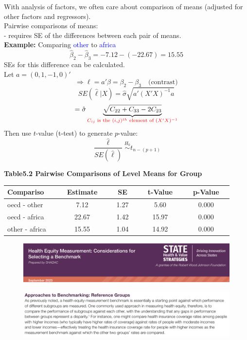 \documentclass[14pt]{extarticle}
\begin{document}
With analysis of factors, we often care about comparison of means (adjusted for other factors and regressors).\\
Pairwise comparisons of means:\\
 - requires SE of the differences between each pair of means.\\
\textbf{Example:} Comparing \textcolor{blue}{other} to \textcolor{blue}{africa}
\[
\hat{\beta}_2 - \hat{\beta}_3 = -7.12 - (-22.67) = 15.55
\]
SEs for this difference can be calculated.\\
Let $a = (0, 1, -1, 0)'$
\[
\Rightarrow \ell = a' \beta = \beta_2 - \beta_3 \quad \text{(contrast)}
\]
\[
SE(\hat{\ell} | X) = \hat{\sigma} \sqrt{ a' (X'X)^{-1} a }
\]
\[
= \hat{\sigma} \underbrace{\sqrt{ C_{22} + C_{33} - 2 C_{23} }}_{\textcolor{red}{C_{ij} \text{ is the } (i,j)^{th} \text{ element of } (X'X)^{-1}}}
\]
Then use $t$-value (t-test) to generate $p$-value:
\[
\frac{\hat{\ell}}{SE(\hat{\ell})} \overset{H_0}{\sim} t_{n - (p + 1)}
\]
\begin{table}[H]
\textbf{Table5.2 Pairwise Comparisons of Level Means for Group}
\centering
\begin{tabular}{lcccc}
\toprule
\textbf{Compariso $\quad$} & \textbf{$\quad$Estimate$\quad$} & \textbf{$\quad$SE$\quad$} & \textbf{$\quad$t-Value$\quad$} & \textbf{$\quad$p-Value$\quad$} \\
\midrule
oecd - other  & 7.12  & 1.27 & 5.60  & 0.000 \\
oecd - africa & 22.67 & 1.42 & 15.97 & 0.000 \\
other - africa & 15.55 & 1.04 & 14.92 & 0.000 \\
\bottomrule
\end{tabular}
\end{table}
\begin{figure}[H]
    \centering
    \includegraphics[width=1\textwidth]{fig2.png}
\end{figure}
\begin{figure}[H]
    \centering
    \includegraphics[width=1\textwidth]{fig3.png}
\end{figure}
\end{document}
